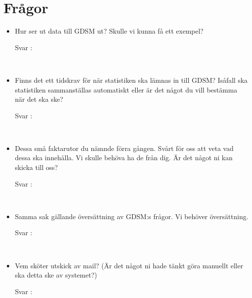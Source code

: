 \documentclass{article}
\date {#1}
\title {
    \documentTitle {Helsingborg Event and Convention Bureau}
    
    \documentDate {}
}
\begin{document}
\maketitle
\thispagestyle{empty}

\newpage




\newpage

\section{Frågor}

 
\begin{itemize}
    \item Hur ser ut data till GDSM ut? Skulle vi kunna få ett exempel?
        \begin{description}
            \item[Svar :]
        \end{description}
    \\
     \item Finns det ett tidskrav för när statistiken ska lämnas in till GDSM? Isåfall ska statistiken sammanställas automatiskt eller är det något du vill bestämma när det ska ske?
        \begin{description}
            \item[Svar :]
        \end{description}
    \\
    \item Dessa små faktarutor du nämnde förra gången. Svårt för oss att veta vad dessa ska innehålla. Vi skulle behöva ha de från dig. Är det något ni kan skicka till oss?
        \begin{description}
            \item[Svar :]
        \end{description}  
    \\
     \item Samma sak gällande översättning av GDSM:s frågor. Vi behöver översättning. 
        \begin{description}
            \item[Svar :]
        \end{description}
    \\
    \item Vem sköter utskick av mail? (Är det något ni hade tänkt göra manuellt eller ska detta ske av systemet?)
        \begin{description}
            \item[Svar :]
        \end{description}
    \\
\end{itemize}
\end{document}
